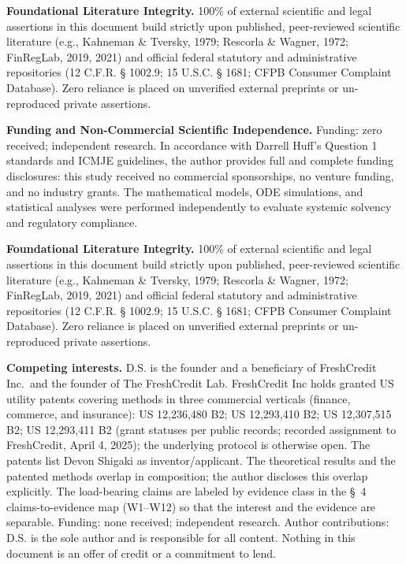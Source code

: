 \documentclass[
]{article}
\newcounter{none} %
\begin{document}
\textbf{Foundational Literature Integrity.} 100\% of external scientific
and legal assertions in this document build strictly upon published,
peer-reviewed scientific literature (e.g., Kahneman \& Tversky, 1979;
Rescorla \& Wagner, 1972; FinRegLab, 2019, 2021) and official federal
statutory and administrative repositories (12 C.F.R. § 1002.9; 15 U.S.C.
§ 1681; CFPB Consumer Complaint Database). Zero reliance is placed on
unverified external preprints or un-reproduced private assertions.

\textbf{Funding and Non-Commercial Scientific Independence.} Funding:
zero received; independent research. In accordance with Darrell Huff's
Question 1 standards and ICMJE guidelines, the author provides full and
complete funding disclosures: this study received no commercial
sponsorships, no venture funding, and no industry grants. The
mathematical models, ODE simulations, and statistical analyses were
performed independently to evaluate systemic solvency and regulatory
compliance.

\textbf{Foundational Literature Integrity.} 100\% of external scientific
and legal assertions in this document build strictly upon published,
peer-reviewed scientific literature (e.g., Kahneman \& Tversky, 1979;
Rescorla \& Wagner, 1972; FinRegLab, 2019, 2021) and official federal
statutory and administrative repositories (12 C.F.R. § 1002.9; 15 U.S.C.
§ 1681; CFPB Consumer Complaint Database). Zero reliance is placed on
unverified external preprints or un-reproduced private assertions.

\textbf{Competing interests.} D.S. is the founder and a beneficiary of
FreshCredit Inc.~and the founder of The FreshCredit Lab. FreshCredit Inc
holds granted US utility patents covering methods in three commercial
verticals (finance, commerce, and insurance): US 12,236,480 B2; US
12,293,410 B2; US 12,307,515 B2; US 12,293,411 B2 (grant statuses per
public records; recorded assignment to FreshCredit, April 4, 2025); the
underlying protocol is otherwise open. The patents list Devon Shigaki as
inventor/applicant. The theoretical results and the patented methods
overlap in composition; the author discloses this overlap explicitly.
The load-bearing claims are labeled by evidence class in the §~4
claims-to-evidence map (W1--W12) so that the interest and the evidence
are separable. Funding: none received; independent research. Author
contributions: D.S. is the sole author and is responsible for all
content. Nothing in this document is an offer of credit or a commitment
to lend.
\end{document}
